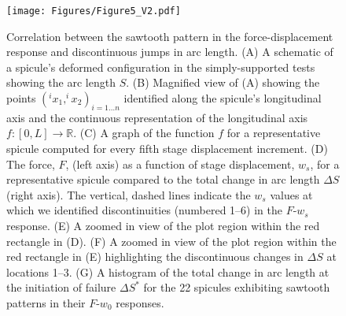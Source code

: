 \begin{figure}[H]
\centering
\texttt{[image: Figures/Figure5\_V2.pdf]}%
\caption{Correlation between the sawtooth pattern in the force-displacement response and discontinuous jumps in arc length. (\textsf{A}) A schematic of a spicule's deformed configuration in the simply-supported tests showing the arc length $S$. (\textsf{B}) Magnified view of (\textsf{A}) showing the points $(^{i}x_1,^{i}x_2)_{i=1\ldots n}$ identified along the spicule's longitudinal axis and the continuous representation of the longitudinal axis $f:[0,L]\rightarrow \mathbb{R}$. (\textsf{C}) A graph of the function $f$ for a representative spicule computed for every fifth stage displacement increment. (\textsf{D}) The force, $F$, (left axis) as a function of stage displacement, $w_s$, for a representative spicule compared to the total change in arc length $\Delta S$ (right axis). The vertical, dashed lines indicate the $w_s$ values at which we identified discontinuities (numbered 1--6) in the $F$-$w_s$ response. (\textsf{E}) A zoomed in view of the plot region within the red rectangle in (\textsf{D}). (\textsf{F}) A zoomed in view of the plot region within the red rectangle in (\textsf{E}) highlighting the discontinuous changes in $\Delta S$ at locations 1--3. (\textsf{G}) A histogram of the total change in arc length at the initiation of failure $\Delta S^*$ for the 22 spicules exhibiting sawtooth patterns in their $F$-$w_0$ responses.}
\label{fig:slip}
\end{figure}
